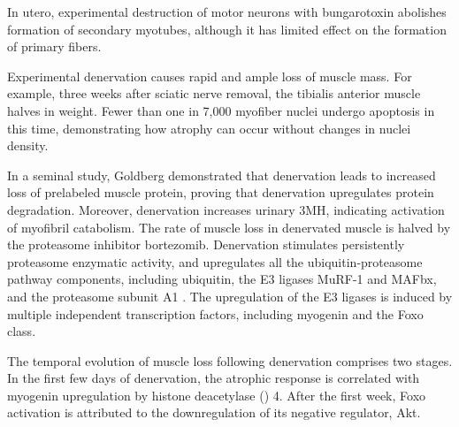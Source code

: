 \documentclass[12pt,english]{report}\usepackage[]{graphicx}\usepackage[]{color}
\begin{document}
In utero, experimental destruction of motor neurons with bungarotoxin
abolishes formation of secondary myotubes, although it has limited
effect on the formation of primary fibers\citep{harris1981embryonic}. 

Experimental denervation causes rapid and ample loss of muscle mass.
For example, three weeks after sciatic nerve removal, the tibialis
anterior muscle halves in weight\citep{macdonald2014denervation}.
Fewer than one in 7,000 myofiber nuclei undergo apoptosis in this
time\citep{bruusgaard2008vivo}, demonstrating how atrophy can occur
without changes in nuclei density.

In a seminal study, Goldberg demonstrated that denervation leads to
increased loss of prelabeled muscle protein, proving that denervation
upregulates protein degradation\citep{goldberg1969protein}. Moreover,
denervation increases urinary 3MH, indicating activation of myofibril
catabolism\citep{furuno1990role}. The rate of muscle loss in denervated
muscle is halved by the proteasome inhibitor bortezomib\citep{beehler2006reduction}.
Denervation stimulates persistently proteasome enzymatic activity\citep{gomes2012upregulation},
and upregulates all the ubiquitin-proteasome pathway components, including
ubiquitin, the E3 ligases MuRF-1 and MAFbx, and the proteasome subunit
A1 \citep{medina1995increase,bodine2001identification}. The upregulation
of the E3 ligases is induced by multiple independent transcription
factors, including myogenin and the Foxo class\citep{fjallstrom2014forkhead,moresi2010myogenin,tang2014mtorc1,macpherson2011myogenin}. 

The temporal evolution of muscle loss following denervation comprises
two stages. In the first few days of denervation, the atrophic response
is correlated with myogenin upregulation by histone deacetylase ()
4\citep{tang2009histone}. After the first week, Foxo activation is
attributed to the downregulation of its negative regulator, Akt\citep{tang2014mtorc1,bodine2001akt/mtor}.
\end{document}
